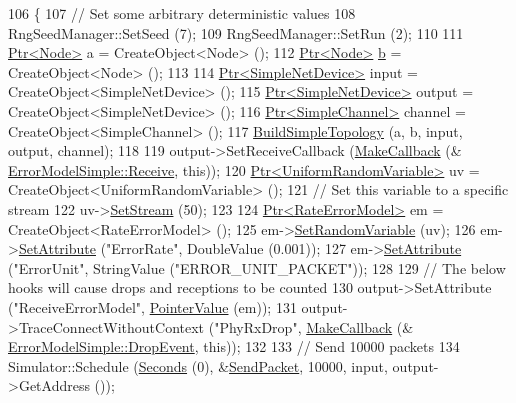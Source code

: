 \begin{DoxyCode}
106 \{
107   \textcolor{comment}{// Set some arbitrary deterministic values}
108   RngSeedManager::SetSeed (7);
109   RngSeedManager::SetRun (2);
110 
111   \hyperlink{classns3_1_1Ptr}{Ptr<Node>} a = CreateObject<Node> ();
112   \hyperlink{classns3_1_1Ptr}{Ptr<Node>} \hyperlink{buildings__pathloss_8m_a21ad0bd836b90d08f4cf640b4c298e7c}{b} = CreateObject<Node> ();
113 
114   \hyperlink{classns3_1_1Ptr}{Ptr<SimpleNetDevice>} input = CreateObject<SimpleNetDevice> ();
115   \hyperlink{classns3_1_1Ptr}{Ptr<SimpleNetDevice>} output = CreateObject<SimpleNetDevice> ();
116   \hyperlink{classns3_1_1Ptr}{Ptr<SimpleChannel>} channel = CreateObject<SimpleChannel> ();
117   \hyperlink{error-model-test-suite_8cc_af6fe24088bb4cfa248fc1b0bad6e1dfc}{BuildSimpleTopology} (a, b, input, output, channel);
118 
119   output->SetReceiveCallback (\hyperlink{group__makecallbackmemptr_ga9376283685aa99d204048d6a4b7610a4}{MakeCallback} (&
      \hyperlink{classErrorModelSimple_a0dfbcbf99f60deae690b469364086707}{ErrorModelSimple::Receive}, \textcolor{keyword}{this}));
120   \hyperlink{classns3_1_1Ptr}{Ptr<UniformRandomVariable>} uv = CreateObject<UniformRandomVariable> ();
121   \textcolor{comment}{// Set this variable to a specific stream }
122   uv->\hyperlink{classns3_1_1RandomVariableStream_add11aaf975607746b7e271d300659a94}{SetStream} (50);
123 
124   \hyperlink{classns3_1_1Ptr}{Ptr<RateErrorModel>} em = CreateObject<RateErrorModel> ();
125   em->\hyperlink{classns3_1_1RateErrorModel_ad4d6eefa1dd7c83e783b56fa23386e5d}{SetRandomVariable} (uv);
126   em->\hyperlink{classns3_1_1ObjectBase_ac60245d3ea4123bbc9b1d391f1f6592f}{SetAttribute} (\textcolor{stringliteral}{"ErrorRate"}, DoubleValue (0.001));
127   em->\hyperlink{classns3_1_1ObjectBase_ac60245d3ea4123bbc9b1d391f1f6592f}{SetAttribute} (\textcolor{stringliteral}{"ErrorUnit"}, StringValue (\textcolor{stringliteral}{"ERROR\_UNIT\_PACKET"}));
128 
129   \textcolor{comment}{// The below hooks will cause drops and receptions to be counted}
130   output->SetAttribute (\textcolor{stringliteral}{"ReceiveErrorModel"}, \hyperlink{classns3_1_1PointerValue}{PointerValue} (em));
131   output->TraceConnectWithoutContext (\textcolor{stringliteral}{"PhyRxDrop"}, \hyperlink{group__makecallbackmemptr_ga9376283685aa99d204048d6a4b7610a4}{MakeCallback} (&
      \hyperlink{classErrorModelSimple_ae0aaa53c27194a91370e022dbb5f9452}{ErrorModelSimple::DropEvent}, \textcolor{keyword}{this}));
132 
133   \textcolor{comment}{// Send 10000 packets}
134   Simulator::Schedule (\hyperlink{group__timecivil_ga33c34b816f8ff6628e33d5c8e9713b9e}{Seconds} (0), &\hyperlink{error-model-test-suite_8cc_a9bb9e47042238c65657a8e00cd67f111}{SendPacket}, 10000, input, output->GetAddress ());

\end{DoxyCode}
